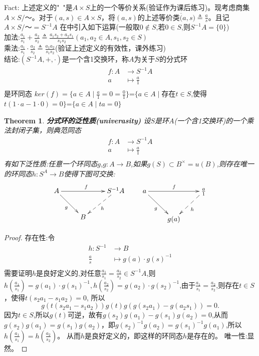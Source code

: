 \documentclass[UTF8]{article}
\newtheorem{thm}{Theorem}[section]
\begin{document}
Fact: 上述定义的"~"是$A\times S$上的一个等价关系(验证作为课后练习)。现考虑商集$A\times S/～$。对于$(a,s)\in A\times S$，将$(a,s)$的上述等价类$\overline(a,s)\triangleq\frac{a}{s}$。且记$A\times S/～=S^{-1}A$
在中引入如下运算(一般取$0\notin S$,若$0\in S$,则$S^{-1}A=\{0\}$)\\
加法:$\frac{a_1}{s_1}+\frac{a_2}{s_2}\triangleq\frac{a_1s_2+a_2s_1}{s_1s_2}(a_1,a_2\in A,s_1,s_2\in S)$\\
乘法:$\frac{a_1}{s_1}·\frac{a_2}{s_2}\triangleq\frac{a_1a_2}{s_1s_2}$(验证上述定义的有效性，课外练习)\\
结论:$(S^{-1}A,+,·)$是一个含1交换环，称$A$为关于$S$的分式环
\[
\begin{split}
f:A&\rightarrow S^{-1}A\\
a&\longmapsto \frac{a}{1}\\
\end{split}
\]
是环同态
$ker(f)=\{a\in A\mid\frac{a}{1}=0=\frac{0}{1}\}$=$\{a\in A\mid$存在$t\in S$,使得$t(1·a-1·0)=0\}$=$\{a\in A\mid ta=0\}$

\begin{thm}
	\textbf{分式环的泛性质(univerasity)}
	设$S$是环$A$(一个含1交换环)的一个乘法封闭子集，则典范同态
	\[
	\begin{split}
	f:A&\rightarrow S^{-1}A\\
	a&\longmapsto \frac{a}{1}\\
	\end{split}
	\]
	有如下泛性质:任意一个环同态$g$,$g:A\rightarrow B$,如果$g(S)\subset B^\times=u(B)$,则存在唯一的环同态$h:S^{A}\rightarrow B$使得下图可交换:
	$$
	\xymatrix{
		A\ar[rr]^{f}\ar[rd]_{g}& &S^{-1}A\\
		&B\ar@{<--}[ru]_{h}&
	}
	\qquad
	\xymatrix{
		a\ar[rd]_{g}\ar[rr]^{f}& & \frac{a}{1}\\
		&g(a)\ar@{<--}[ru]_{h}&
	}
	$$
	
\end{thm}

\begin{proof}
	存在性:令
	\[
	\begin{split}
	h:S^{-1}&\rightarrow B\\
	\frac{a}{s}&\longmapsto g(a)·g(s)^{-1}\\
	\end{split}
	\]
	需要证明$h$是良好定义的,对任意$\frac{a_1}{s_1}=\frac{a_2}{s_2}\in S^{-1}A$,则$h(\frac{a_1}{s_1})=g(a_1)·g(s_1)^{-1},h(\frac{a_2}{s_2})=g(a_2)·g(s_2)^{-1}$,由于$\frac{a_1}{s_1}=\frac{a_2}{s_2}$,则存在$t\in S$，使得$t(s_2a_1-s_1a_2)=0$,
	所以
	$$g(t(s_2a_1-s_1a_2))g(t)g(g(s_2a_1)-g(a_2s_1))=0.$$
	因为$t\in S$,所以$g(t)$可逆，故有$g(s_2)g(a_1)-g(s_1)g(a_2)=0$,从而$g(s_2)g(a_1)=g(s_1)g(a_2)$，即$g(s_2)^{-1}g(a_2)=g(s_1)^{-1}g(a_1)$,所以$h(\frac{a_1}{s_1})=h(\frac{a_2}{s_2})$。
	从而$h$是良好定义的，即这样的环同态$h$是存在的。
	唯一性:显然。
\end{proof}
\end{document}
